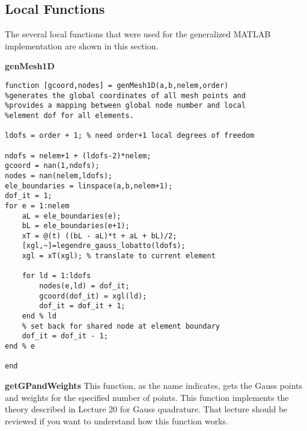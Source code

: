 \subsection{Local Functions}
The several local functions that were used for the generalized MATLAB implementation are shown in this section.

\vspace{0.25cm}

\noindent\textbf{genMesh1D}
\begin{lstlisting}[style=myMatlab,name=lec34n-ex2]
function [gcoord,nodes] = genMesh1D(a,b,nelem,order)
%generates the global coordinates of all mesh points and 
%provides a mapping between global node number and local
%element dof for all elements.

ldofs = order + 1; % need order+1 local degrees of freedom

ndofs = nelem+1 + (ldofs-2)*nelem;
gcoord = nan(1,ndofs);
nodes = nan(nelem,ldofs);
ele_boundaries = linspace(a,b,nelem+1);
dof_it = 1;
for e = 1:nelem 
    aL = ele_boundaries(e);
    bL = ele_boundaries(e+1);
    xT = @(t) ((bL - aL)*t + aL + bL)/2;
    [xgl,~]=legendre_gauss_lobatto(ldofs);
    xgl = xT(xgl); % translate to current element

    for ld = 1:ldofs
        nodes(e,ld) = dof_it;
        gcoord(dof_it) = xgl(ld);
        dof_it = dof_it + 1;
    end % ld
    % set back for shared node at element boundary
    dof_it = dof_it - 1; 
end % e

end
\end{lstlisting}

\vspace{0.25cm}

\noindent\textbf{getGPandWeights}
This function, as the name indicates, gets the Gauss points and weights for the specified number of points.  This function implements the theory described in Lecture 20 for Gauss quadrature.  That lecture should be reviewed if you want to understand how this function works.

\vspace{0.5cm}


